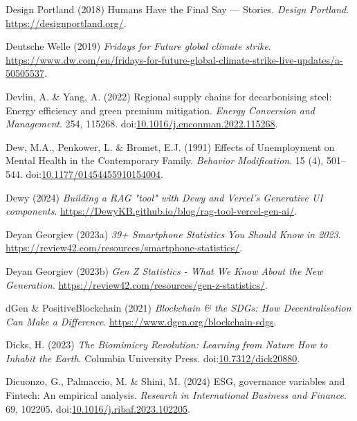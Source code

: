 \documentclass[
  letterpaper,
  DIV=11,
  numbers=noendperiod]{scrartcl}
\newlength{\cslhangindent}
\newenvironment{CSLReferences}[2] %
 {\begin{list}{}{%
  \setlength{\itemindent}{0pt}
  \setlength{\leftmargin}{0pt}
  \setlength{\parsep}{0pt}
  \ifodd #1
   \setlength{\leftmargin}{\cslhangindent}
   \setlength{\itemindent}{-1\cslhangindent}
  \fi
  \setlength{\itemsep}{#2\baselineskip}}}
 {\end{list}}
\begin{document}
\begin{CSLReferences}{0}{1}
Design Portland (2018) Humans {Have} the {Final Say} --- {Stories}.
\emph{Design Portland}. \url{https://designportland.org/}.

Deutsche Welle (2019) \emph{Fridays for {Future} global climate strike}.
\url{https://www.dw.com/en/fridays-for-future-global-climate-strike-live-updates/a-50505537}.

Devlin, A. \& Yang, A. (2022) Regional supply chains for decarbonising
steel: {Energy} efficiency and green premium mitigation. \emph{Energy
Conversion and Management}. 254, 115268.
doi:\href{https://doi.org/10.1016/j.enconman.2022.115268}{10.1016/j.enconman.2022.115268}.

Dew, M.A., Penkower, L. \& Bromet, E.J. (1991) Effects of {Unemployment}
on {Mental Health} in the {Contemporary Family}. \emph{Behavior
Modification}. 15 (4), 501--544.
doi:\href{https://doi.org/10.1177/01454455910154004}{10.1177/01454455910154004}.

Dewy (2024) \emph{Building a {RAG} "tool" with {Dewy} and {Vercel}'s
{Generative UI} components}.
\url{https://DewyKB.github.io/blog/rag-tool-vercel-gen-ai/}.

Deyan Georgiev (2023a) \emph{39+ {Smartphone Statistics You Should Know}
in 2023}. \url{https://review42.com/resources/smartphone-statistics/}.

Deyan Georgiev (2023b) \emph{Gen {Z Statistics} - {What We Know About}
the {New Generation}}.
\url{https://review42.com/resources/gen-z-statistics/}.

dGen \& PositiveBlockchain (2021) \emph{Blockchain \& the {SDGs}: {How
Decentralisation Can Make} a {Difference}}.
\url{https://www.dgen.org/blockchain-sdgs}.

Dicks, H. (2023) \emph{The {Biomimicry Revolution}: {Learning} from
{Nature How} to {Inhabit} the {Earth}}. Columbia University Press.
doi:\href{https://doi.org/10.7312/dick20880}{10.7312/dick20880}.

Dicuonzo, G., Palmaccio, M. \& Shini, M. (2024) {ESG}, governance
variables and {Fintech}: {An} empirical analysis. \emph{Research in
International Business and Finance}. 69, 102205.
doi:\href{https://doi.org/10.1016/j.ribaf.2023.102205}{10.1016/j.ribaf.2023.102205}.


\end{CSLReferences}
\end{document}
